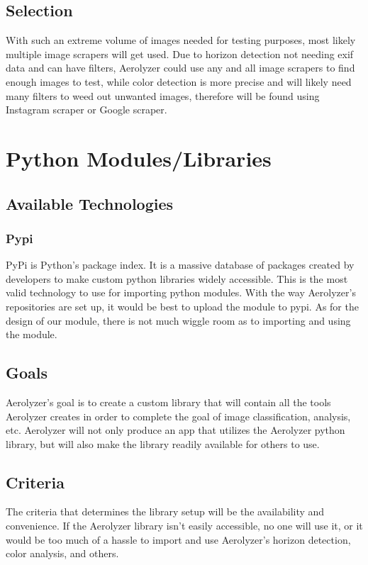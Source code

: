 \documentclass[onecolumn, draftclsnofoot,10pt, compsoc]{IEEEtran}
\begin{document}
\begin{singlespace}
\subsection{Selection}
With such an extreme volume of images needed for testing purposes, most likely multiple image scrapers will get used. Due to horizon detection not needing exif data and can have filters, Aerolyzer could use any and all image scrapers to find enough images to test, while color detection is more precise and will likely need many filters to weed out unwanted images, therefore will be found using Instagram scraper or Google scraper.


\section{Python Modules/Libraries}
\subsection{Available Technologies}
\subsubsection{Pypi}
PyPi is Python's package index. It is a massive database of packages created by developers to make custom python libraries widely accessible. This is the most valid technology to use for importing python modules. With the way Aerolyzer's repositories are set up, it would be best to upload the module to pypi. As for the design of our module, there is not much wiggle room as to importing and using the module. \cite{pypi}

\subsection{Goals}
Aerolyzer's goal is to create a custom library that will contain all the tools Aerolyzer creates in order to complete the goal of image classification, analysis, etc. Aerolyzer will not only produce an app that utilizes the Aerolyzer python library, but will also make the library readily available for others to use.

\subsection{Criteria}
The criteria that determines the library setup will be the availability and convenience. If the Aerolyzer library isn't easily accessible, no one will use it, or it would be too much of a hassle to import and use Aerolyzer's horizon detection, color analysis, and others.

\end{singlespace}
\end{document}
